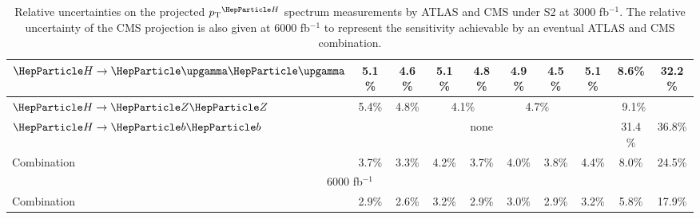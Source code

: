 \begin{table}[th]
{\begin{tabular}{l|cccccccc|c|c|c|c|c|c|c|c}
    \hline
    $\hgg$       & \multicolumn{4}{c|}{5.1\%} & \multicolumn{4}{c|}{4.6\%} & 5.1\%                      & \multicolumn{2}{c|}{4.8\%} & 4.9\%  & 4.5\%   & 5.1\%   & 8.6\%   & 32.2\%                                           \\     
    \hline
    $\hzz$       & \multicolumn{4}{c|}{5.4\%} & \multicolumn{4}{c|}{4.8\%} & \multicolumn{3}{c|}{4.1\%} & \multicolumn{2}{c|}{4.7\%} & \multicolumn{3}{c}{9.1\%}                                                               \\ 
    \hline
    $\hbb$       & \multicolumn{14}{c|}{none} & 31.4\%                     & 36.8\%                                                                                                                                            \\ 
    \hline
    Combination  & \multicolumn{4}{c|}{3.7\%} & \multicolumn{4}{c|}{3.3\%} & 4.2\%                      & \multicolumn{2}{c|}{3.7\%} & 4.0\%  & 3.8\%   & 4.4\%   & 8.0\%   & 24.5\%                                           \\
    \hline
    \hline
    \multicolumn{17}{c}{6000 fb$^{-1}$}                                                                                                                                                                                                   \\
    \hline
    \hline
    Combination  & \multicolumn{4}{c|}{2.9\%} & \multicolumn{4}{c|}{2.6\%} & 3.2\% & \multicolumn{2}{c|}{2.9\%} & 3.0\% & 2.9\% & 3.2\% & 5.8\% & 17.9\% \\
    \hline
    \hline
  \end{tabular}
  }
  \caption{Relative uncertainties on the projected $\pTH$ spectrum measurements by ATLAS and CMS under S2 at 3000 fb$^{-1}$. The relative uncertainty of the CMS projection is also given at 6000 fb$^{-1}$ to represent the sensitivity achievable by an eventual ATLAS and CMS combination.}
  \label{tab:proj_pth_unc_scen2}
\end{table}

